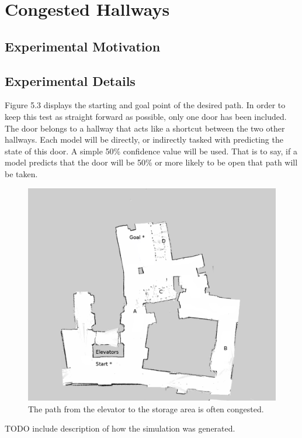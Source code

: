   \section{ Congested Hallways }

  \subsection{ Experimental Motivation }



  \subsection{ Experimental Details }

  Figure 5.3 displays the starting and goal point of the
  desired path. In order to keep this test as straight forward as possible, only
  one door has been included. The door belongs to a hallway that acts like a
  shortcut between the two other hallways. Each model will be directly, or
  indirectly tasked with predicting the state of this door. A simple 50\%
  confidence value will be used. That is to say, if a model predicts that the
  door will be 50\% or more likely to be open that path will be taken. \\


  \begin{figure}[!htb]
    \centering
    \includegraphics[width=\linewidth]{images/basement_congestion.png}
    \caption{The path from the elevator to the storage area is often congested. }
    \label{figure:basement_congestion}
  \end{figure}


  TODO include description of how the simulation was generated.


